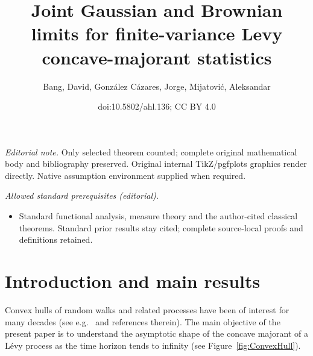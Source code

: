 \documentclass[10pt]{amsart}
\title{Joint Gaussian and Brownian limits for finite-variance Levy concave-majorant statistics}
\author{Bang, David, González Cázares, Jorge, Mijatović, Aleksandar}
\date{doi:10.5802/ahl.136; CC BY 4.0}
\theoremstyle{definition}\newtheorem{defi}[theo]{Definition}\newtheorem{rema}[theo]{Remark}\newtheorem{exam}[theo]{Example}\newtheorem{exem}[theo]{Example}\newtheorem{nota}[theo]{Notation}
\newcommand\1{\mathds{1}}
\begin{document}
\maketitle
\noindent\textit{Editorial note.} Only selected theorem counted; complete original mathematical body and bibliography preserved. Original internal TikZ/pgfplots graphics render directly. Native assumption environment supplied when required.\par\medskip
\noindent\textit{Allowed standard prerequisites (editorial).}\begin{itemize}
\item Standard functional analysis, measure theory and the author-cited classical theorems. Standard prior results stay cited; complete source-local proofs and definitions retained.
\end{itemize}\medskip


\section{Introduction and main results}\label{sec:intro}
Convex hulls of random walks and related processes have been of interest for many decades (see e.g.~\cite{RWpaper,MR2898714,MR3564216,MR3896868,MR2978134,randonfurling2020convex} and references therein). The main objective of the present paper is to understand the asymptotic shape of the concave majorant of a Lévy process as the time horizon tends to infinity (see Figure~\ref{fig:ConvexHull}).
\end{document}
